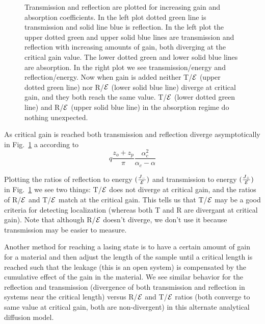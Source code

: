 \begin{figure}
\vskip -0.5cm
\centerline{
}
\vskip -0.5cm
\caption[Transmission and reflection are plotted for increasing gain and absorption coefficients.]{Transmission and reflection are plotted for increasing gain and absorption coefficients. In the left plot dotted green line is transmission and solid line blue is reflection. In the left plot the upper dotted green and upper solid blue lines are transmission and reflection with increasing amounts of gain, both diverging at the critical gain value. The lower dotted green and lower solid blue lines are absorption.  In the right plot we see transmission/energy and reflection/energy.  Now when gain is added neither T/${\cal E}$ (upper dotted green line) nor R/${\cal E}$ (lower solid blue line) diverge at critical gain, and they both reach the same value. T/${\cal E}$ (lower dotted green line) and R/${\cal E}$ (upper solid blue line) in the absorption regime do nothing unexpected.}
\label{fig:diffusiveRTRETE}
\end{figure}

As critical gain is reached both transmission and reflection diverge asymptotically in Fig.~\ref{fig:diffusiveRTRETE} a according to
\begin{equation}
q \frac{z_o + z_p}{\pi} \frac{\alpha _c ^2}{\alpha _c - \alpha}
\end{equation}

Plotting the ratios of reflection to energy $( \frac{J_-}{\cal E} ) $
and transmission to energy $( \frac{J_+}{\cal E} ) $ in Fig.~\ref{fig:diffusiveRTRETE}
we see two things: T/${\cal E}$ does not diverge at critical gain, and the ratios 
of R/${\cal E}$ and T/${\cal E}$ match
at the critical gain. This tells us that T/${\cal E}$ may be a good
criteria for detecting localization (whereas both T and
R are divergant at critical gain).  Note that although
R/${\cal E}$ doesn't diverge, we don't use it because transmission may be 
easier to measure.

Another method for reaching a lasing state is to have a certain
amount of gain for a material and then adjust the length of the
sample until a critical length is reached such that the leakage
(this is an open system) is compensated by the cumulative
effect of the gain in the material. We see similar behavior
for the reflection and transmission (divergence of both transmission
and reflection in systems
near the critical length) versus R/${\cal E}$ and T/${\cal E}$ ratios (both converge
to same value at critical gain, both are non-divergent) in this
alternate analytical diffusion model.

